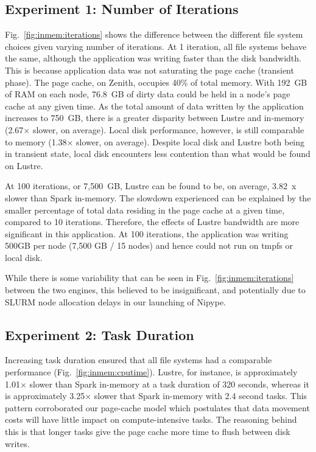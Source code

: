 \subsection{Experiment 1: Number of Iterations}

Fig.~\ref{fig:inmem:iterations} shows the difference between the different file system
choices given varying number of iterations. At 1 iteration, all file systems
behave the same, although the application was writing faster than the disk
bandwidth. This is because application data was not saturating the page cache
(transient phase). The page cache, on Zenith, occupies 40\% of total memory.
With 192~GB of RAM on each node, 76.8~GB of dirty data could be held in a node's
page cache at any given time. As the total amount of data written by the
application increases to 750~GB, there is a greater disparity between Lustre and
in-memory (2.67$\times$ slower, on average). Local disk performance, however, is still
comparable to memory (1.38$\times$ slower, on average). Despite local disk and Lustre
both being in transient state, local disk encounters less contention than what
would be found on Lustre. 

At 100 iterations, or 7,500~GB, Lustre can be found to be, on average, 3.82~x
slower than Spark in-memory. The slowdown experienced can be explained by the
smaller percentage of total data residing in the page cache at a given time,
compared to 10 iterations. Therefore, the effects of Lustre bandwidth are more
significant in this application. At 100 iterations, the application was writing
500GB per node (7,500 GB / 15 nodes) and hence could not run on tmpfs or local
disk.

While there is some variability that can be seen in Fig.~\ref{fig:inmem:iterations}
between the two engines, this believed to be insignificant, and potentially due
to SLURM node allocation delays in our launching of Nipype.


\subsection{Experiment 2: Task Duration}
%

Increasing task duration ensured that all file systems had a comparable
performance (Fig.~\ref{fig:inmem:cputime}). Lustre, for instance, is approximately
1.01$\times$ slower than Spark in-memory at a task duration of 320 seconds, whereas it
is approximately 3.25$\times$ slower that Spark in-memory with 2.4 second tasks. This
pattern corroborated our page-cache model which postulates that data movement
costs will have little impact on compute-intensive tasks. The reasoning behind
this is that longer tasks give the page cache more time to flush between disk
writes.

